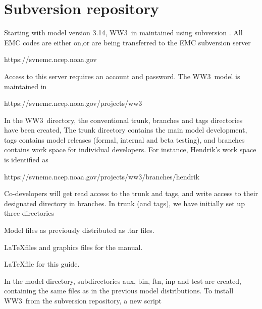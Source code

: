 \documentclass[12pt]{article}
\newcommand{\ws}{WW3}
\newcommand{\file}{\sf}
\newcommand{\newsec}{\setcounter{equation}{0}
                      \setcounter{myfigno}{0}
                      \setcounter{mytabno}{0}}
\newenvironment{flist}{\begin{list}{nofile ?}{\parsep 0mm
            \itemsep 0mm \leftmargin 35mm \labelwidth 25mm
            \rightmargin 10mm}}{\end{list}}
\newcommand{\fit}[2]{\item[{\file{#1}}\hfill]{#2}}
\newcounter{myfigno}[section]
\newcounter{mytabno}[section]
\begin{document}
\section{Subversion repository} \label{sec:svn}
\newsec

Starting with model version 3.14, \ws\ in maintained using subversion
\citep{bk:CSea06}. All EMC codes are either on,or are being transferred to the
EMC subversion server

\vspace{\baselineskip}
\centerline{\file https://svnemc.ncep.noaa.gov}
\vspace{\baselineskip}

\noindent
Access to this server requires an account and password. The \ws\ model is
maintained in

\vspace{\baselineskip}
\centerline{\file https://svnemc.ncep.noaa.gov/projects/ww3}
\vspace{\baselineskip}

\noindent
In the \ws\ directory, the conventional {\file trunk}, {\file branches} and
{\file tags} directories have been created, The {\file trunk} directory
contains the main model development, {\file tags} contains model releases
(formal, internal and beta testing), and {\file branches} contains work space
for individual developers. For instance, Hendrik's work space is identified as

\vspace{\baselineskip}
\centerline{\file https://svnemc.ncep.noaa.gov/projects/ww3/branches/hendrik}
\vspace{\baselineskip}

\noindent
Co-developers will get read access to the {\file trunk} and {\file tags}, and
write access to their designated directory in {\file branches}. In {\file
trunk} (and {\file tags}), we have initially set up three directories

\begin{flist}
\fit{model }{Model files as previously distributed as {\file .tar} files.}
\fit{manual}{\LaTeX files and graphics files for the manual.}
\fit{guide }{\LaTeX file for this guide.}
\end{flist}

\noindent
In the {\file model} directory, subdirectories {\file aux}, {\file bin},
{\file ftn}, {\file inp} and {\file test} are created, containing the same
files as in the previous model distributions. To install \ws\ from the
subversion repository, a new script
\end{document}
